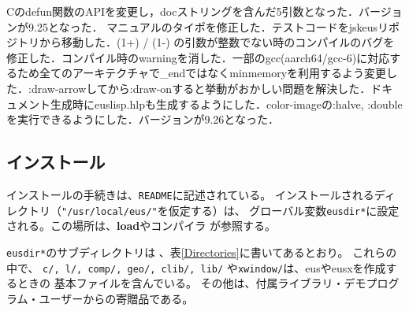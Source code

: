 \begin{description}
            Cのdefun関数のAPIを変更し，docストリングを含んだ5引数となった．バージョンが9.25となった．
            マニュアルのタイポを修正した．テストコードをjskeusリポジトリから移動した．(1+) / (1-) の引数が整数でない時のコンパイルのバグを修正した．コンパイル時のwarningを消した．一部のgcc(aarch64/gcc-6)に対応するため全てのアーキテクチャで\_endではなくminmemoryを利用するよう変更した．:draw-arrowしてから:draw-onすると挙動がおかしい問題を解決した．ドキュメント生成時にeuslisp.hlpも生成するようにした．color-imageの:halve, :doubleを実行できるようにした．バージョンが9.26となった．
\end{description}

\subsection{インストール}
インストールの手続きは、{\tt README}に記述されている。
インストールされるディレクトリ（{\tt "/usr/local/eus/"}を仮定する）は、
グローバル変数{\tt *eusdir*}に設定される。この場所は、{\bf load}やコンパイラ
が参照する。

{\tt *eusdir*}のサブディレクトリは 、表\ref{Directories}に書いてあるとおり。
これらの中で、
{\tt c/, l/, comp/, geo/, clib/, lib/} や{\tt xwindow/}は、eusやeusxを作成するときの
基本ファイルを含んでいる。
その他は、付属ライブラリ・デモプログラム・ユーザーからの寄贈品である。

